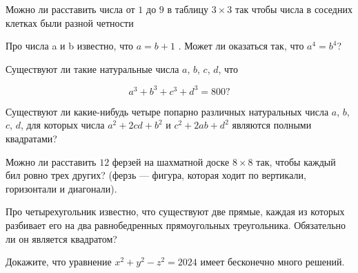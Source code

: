 \begin{flushright}
        \scriptsize{}
\end{flushright}

Можно ли расставить числа от $1$ до $9$ в таблицу $3\times 3$ так чтобы числа в соседних клетках были разной четности

Про числа a и b известно, что $a=b+1$ . Может ли оказаться так, что $a^4=b^4$?

Существуют ли такие натуральные числа $a$, $b$, $c$, $d$, что 

\[a^3+b^3+c^3+d^3=800?\]

Существуют ли какие-нибудь четыре попарно различных натуральных числа $a$, $b$, $c$, $d$, для которых числа  $a^2 + 2cd + b^2$  и  $c^2 + 2ab + d^2$  являются полными квадратами?

Можно ли расставить $12$ ферзей на шахматной доске $8 \times 8$ так, чтобы каждый бил ровно трех других? (ферзь --- фигура, которая ходит по вертикали, горизонтали и диагонали).

Про четырехугольник известно, что существуют две прямые, каждая из которых разбивает его на два равнобедренных прямоугольных треугольника. Обязательно ли он является квадратом?

Докажите, что уравнение $x^2 + y^2 - z^2 = 2024$ имеет бесконечно много решений.